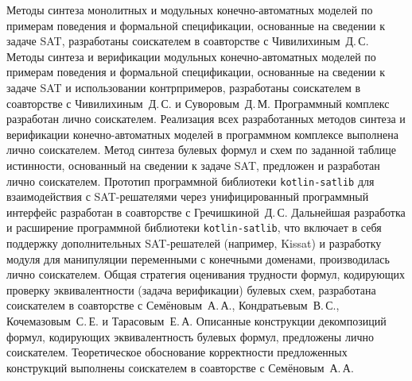 



%
\contribution
%
Методы синтеза монолитных и модульных конечно-автоматных моделей по примерам поведения и формальной спецификации, основанные на сведении к задаче SAT, разработаны соискателем в соавторстве с Чивилихиным~Д.\,С.
Методы синтеза и верификации модульных конечно-автоматных моделей по примерам поведения и формальной спецификации, основанные на сведении к задаче SAT и использовании контрпримеров, разработаны соискателем в соавторстве с Чивилихиным~Д.\,С. и Суворовым~Д.\,М.
Программный комплекс  разработан лично соискателем.
Реализация всех разработанных методов синтеза и верификации конечно-автоматных моделей в программном комплексе  выполнена лично соискателем.
Метод синтеза булевых формул и схем по заданной таблице истинности, основанный на сведении к задаче SAT, предложен и разработан лично соискателем.
Прототип программной библиотеки \texttt{kotlin-satlib} для взаимодействия с SAT-решателями через унифицированный программный интерфейс разработан в соавторстве с Гречишкиной~Д.\,С.
Дальнейшая разработка и расширение программной библиотеки \texttt{kotlin-satlib}, что включает в себя поддержку дополнительных SAT-решателей (например, Kissat) и разработку модуля для манипуляции переменными с конечными доменами, производилась лично соискателем.
Общая стратегия оценивания трудности формул, кодирующих проверку эквивалентности (задача верификации) булевых схем, разработана соискателем в соавторстве с Семёновым~А.\,А., Кондратьевым~В.\,С., Кочемазовым~С.\,Е. и Тарасовым~Е.\,А.
Описанные конструкции декомпозиций формул, кодирующих эквивалентность булевых формул, предложены лично соискателем.
Теоретическое обоснование корректности предложенных конструкций выполнены соискателем в соавторстве с Семёновым~А.\,А.
